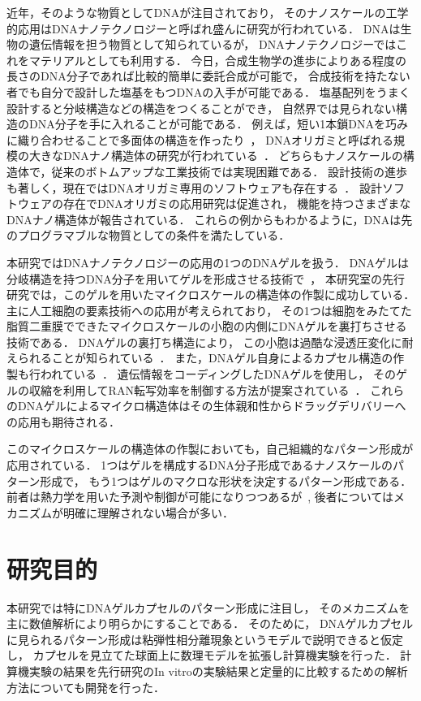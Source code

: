 近年，そのような物質としてDNAが注目されており，
そのナノスケールの工学的応用はDNAナノテクノロジーと呼ばれ盛んに研究が行われている．
DNAは生物の遺伝情報を担う物質として知られているが，
DNAナノテクノロジーではこれをマテリアルとしても利用する．
今日，合成生物学の進歩によりある程度の長さのDNA分子であれば比較的簡単に委託合成が可能で，
合成技術を持たない者でも自分で設計した塩基をもつDNAの入手が可能である．
塩基配列をうまく設計すると分岐構造などの構造をつくることができ，
自然界では見られない構造のDNA分子を手に入れることが可能である．
例えば，短い1本鎖DNAを巧みに織り合わせることで多面体の構造を作ったり~\cite{chen1991synthesis}，
DNAオリガミと呼ばれる規模の大きなDNAナノ構造体の研究が行われている~\cite{rothemund2006folding}．
どちらもナノスケールの構造体で，従来のボトムアップな工業技術では実現困難である．
設計技術の進歩も著しく，現在ではDNAオリガミ専用のソフトウェアも存在する~\cite{douglas2009rapid}．
設計ソフトウェアの存在でDNAオリガミの応用研究は促進され，
機能を持つさまざまなDNAナノ構造体が報告されている．
これらの例からもわかるように，DNAは先のプログラマブルな物質としての条件を満たしている．


本研究ではDNAナノテクノロジーの応用の1つのDNAゲルを扱う．
DNAゲルは分岐構造を持つDNA分子を用いてゲルを形成させる技術で~\cite{um2006enzyme}，
本研究室の先行研究では，このゲルを用いたマイクロスケールの構造体の作製に成功している．
主に人工細胞の要素技術への応用が考えられており，
その1つは細胞をみたてた脂質二重膜でできたマイクロスケールの小胞の内側にDNAゲルを裏打ちさせる技術である．
DNAゲルの裏打ち構造により，
この小胞は過酷な浸透圧変化に耐えられることが知られている~\cite{kurokawa2017dna}．
また，DNAゲル自身によるカプセル構造の作製も行われている~\cite{morita2017formation}．
遺伝情報をコーディングしたDNAゲルを使用し，
そのゲルの収縮を利用してRAN転写効率を制御する方法が提案されている~\cite{watanabe}．
これらのDNAゲルによるマイクロ構造体はその生体親和性からドラッグデリバリーへの応用も期待される．

このマイクロスケールの構造体の作製においても，自己組織的なパターン形成が応用されている．
1つはゲルを構成するDNA分子形成であるナノスケールのパターン形成で，
もう1つはゲルのマクロな形状を決定するパターン形成である．
前者は熱力学を用いた予測や制御が可能になりつつあるが~\cite{zadeh2011nupack}, 
後者についてはメカニズムが明確に理解されない場合が多い．


\section{研究目的}
本研究では特にDNAゲルカプセルのパターン形成に注目し，
そのメカニズムを主に数値解析により明らかにすることである．
そのために，
DNAゲルカプセルに見られるパターン形成は粘弾性相分離現象というモデルで説明できると仮定し，
カプセルを見立てた球面上に数理モデルを拡張し計算機実験を行った．
計算機実験の結果を先行研究のIn vitroの実験結果と定量的に比較するための解析方法についても開発を行った．

